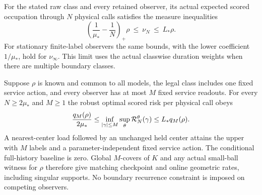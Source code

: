 \begin{theorem}\label{thm:controlled-load}
For the stated raw class and every retained observer, its actual expected scored occupation through $N$ physical calls satisfies the measure inequalities
\begin{equation}\label{eq:load-occupation}
 \left(\frac1{\mu_*}-\frac1N\right)_+\rho
       \ \le\ \nu_N\ \le\ L_*\rho.
\end{equation}
For stationary finite-label observers the same bounds, with the lower coefficient $1/\mu_*$, hold for $\nu_\infty$. This limit uses the actual classwise duration weights when there are multiple boundary classes.

Suppose $\rho$ is known and common to all models, the legal class includes one fixed service action, and every observer has at most $M$ fixed service readouts. For every $N\ge2\mu_*$ and $M\ge1$ the robust optimal scored risk per physical call obeys
\begin{equation}\label{eq:load-risk}
 \frac{q_M(\rho)}{2\mu_*}
 \le\inf_{|\gamma|\le M}\sup_\theta\mathcal R_N^\theta(\gamma)
 \le L_*q_M(\rho).
\end{equation}
A nearest-center load followed by an unchanged held center attains the upper with $M$ labels and a parameter-independent fixed service action. The conditional full-history baseline is zero. Global $M$-covers of $K$ and any actual small-ball witness for $\rho$ therefore give matching checkpoint and online geometric rates, including singular supports. No boundary recurrence constraint is imposed on competing observers.
\end{theorem}
